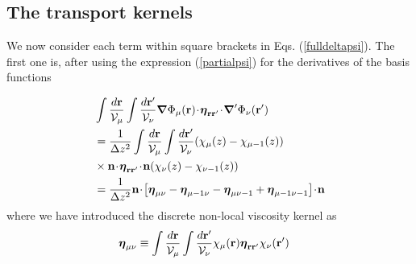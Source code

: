 \documentclass[b5paper,openright,11pt]{book}
\newcommand{\esc}{\!\cdot\!}
\begin{document}
\subsection{The transport kernels}
We   now  consider   each  term   within  square   brackets  in 
Eqs. (\ref{fulldeltapsi}). The first one is, after using the expression
(\ref{partialpsi}) for the derivatives of the basis functions

\begin{align}
&\int \frac{d{\bf r}}{{\cal V}_\mu}
\int \frac{d{\bf r}'}{{\cal V}_\nu}
\boldsymbol{\nabla}\Phi_\mu({\bf r})
\esc\boldsymbol{\eta}_{{\bf r}{\bf r}'}\esc
{\boldsymbol{\nabla}^\prime}\Phi_\nu({\bf r}')
\nonumber\\
&=
\frac{1}{\Delta z^2}\int \frac{d{\bf r}}{{\cal V}_\mu}
\int \frac{d{\bf r}'}{{\cal V}_\nu}
(\chi_\mu(z)-\chi_{\mu-1}(z))
\nonumber\\
&\times{\bf n}\esc\boldsymbol{\eta}_{{\bf r}{\bf r}'}\esc{\bf n}(\chi_\nu(z)-\chi_{\nu-1}(z))
\nonumber\\
&=
\frac{1}{\Delta z^2} {\bf n}\esc\left[\boldsymbol{\eta}_{\mu\nu}-\boldsymbol{\eta}_{\mu-1\nu}-\boldsymbol{\eta}_{\mu\nu-1}+\boldsymbol{\eta}_{\mu-1\nu-1}\right]\esc{\bf n}
\label{TC1}
\end{align}
where we have introduced the discrete non-local viscosity kernel as
\begin{align}
\boldsymbol{\eta}_{\mu\nu}&\equiv  \int \frac{d{\bf r}}{{\cal V}_\mu}
\int \frac{d{\bf r}'}{{\cal V}_\nu}
\chi_\mu({\bf r})
\boldsymbol{\eta}_{{\bf r}{\bf r}'}\chi_\nu({\bf r}')
\label{s2disc}
\end{align}
\end{document}
